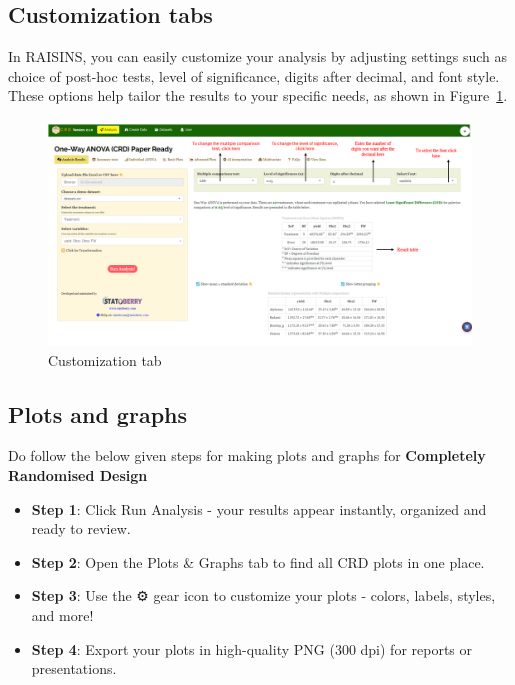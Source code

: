 \documentclass[
  letterpaper,
  DIV=11,
  numbers=noendperiod]{scrartcl}
\begin{document}
\hypertarget{sec-cust}{%
\subsection{Customization tabs}\label{sec-cust}}

In RAISINS, you can easily customize your analysis by adjusting settings
such as choice of post-hoc tests, level of significance, digits after
decimal, and font style. These options help tailor the results to your
specific needs, as shown in Figure~\ref{fig-custom}.

\begin{figure}

{\centering \includegraphics{CUSRES.webp}

}

\caption{\label{fig-custom}Customization tab}

\end{figure}

\hypertarget{sec-plots}{%
\subsection{Plots and graphs}\label{sec-plots}}

Do follow the below given steps for making plots and graphs for
\textbf{Completely Randomised Design}

\begin{itemize}
\item
  \textbf{Step 1}: Click Run Analysis - your results appear instantly,
  organized and ready to review.
\item
  \textbf{Step 2}: Open the Plots \& Graphs tab to find all CRD plots in
  one place.
\item
  \textbf{Step 3}: Use the ⚙️ gear icon to customize your plots -
  colors, labels, styles, and more!
\item
  \textbf{Step 4}: Export your plots in high-quality PNG (300 dpi) for
  reports or presentations.
\end{itemize}
\end{document}
